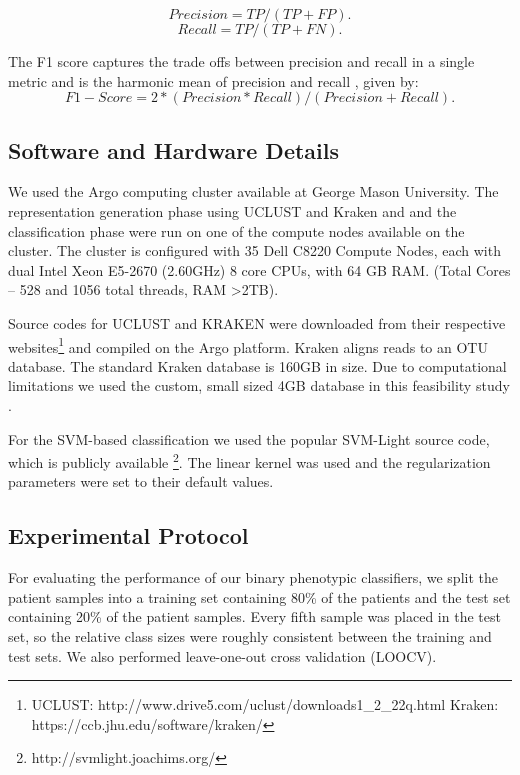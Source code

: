 \begin{equation}
Precision = TP / (TP + FP). \label{eqn:prec}
\end{equation}
\begin{equation}
Recall = TP / (TP +FN). \label{eqn:roc}
\end{equation}

The F1 score captures the trade offs between precision and recall in a
single metric and is the harmonic mean of precision and recall \cite{Goutte}, given 
by:
\begin{equation}
F1-Score = 2 * (Precision * Recall)/ (Precision + Recall). \label{eqn:f1}
\end{equation}

\subsection{Software and Hardware Details}
We used the Argo computing cluster available at George Mason University. 
%
The representation generation phase using UCLUST and Kraken and and the classification phase
were 
run on one of the  compute nodes available on the cluster. The cluster is configured with 
35 Dell C8220 Compute Nodes, each with dual 
Intel Xeon E5-2670 (2.60GHz) 8 core CPUs, with 64 GB RAM. (Total Cores – 
528 and 1056 total threads, RAM \textgreater 2TB)\cite{ORC}.

Source codes for UCLUST \cite{Edgar10} and KRAKEN \cite{Wood14} were downloaded from 
their respective websites\footnote{UCLUST: http://www.drive5.com/uclust/downloads1\_{}2\_{}22q.html     
Kraken: https://ccb.jhu.edu/software/kraken/} and compiled on the Argo platform. 
%
Kraken aligns reads to an OTU database. The standard Kraken database is 160GB in size. Due to 
computational limitations we used the custom, small sized 4GB
database  in this feasibility study \cite{Kraken}.

For the  SVM-based classification\cite{Joachims08}  we used the popular 
SVM-Light \cite{Joachims08}  source code, which is publicly 
available \footnote{http://svmlight.joachims.org/}.  The linear kernel was used
and the regularization parameters were set to their default values. 



\subsection{Experimental Protocol}

For evaluating the performance of our binary phenotypic classifiers, we 
split the patient samples into a training set containing 80\% of the 
patients and the test set containing 20\% of the patient samples. Every fifth sample was placed in the test set, so the relative class sizes were roughly consistent between the training and test sets.
We also performed leave-one-out cross validation (LOOCV). 

